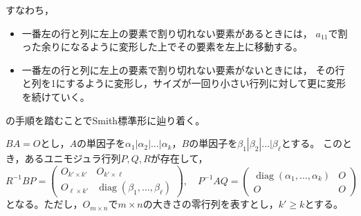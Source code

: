 \documentclass[uplatex]{jsarticle}
\DeclareMathOperator{\diag}{diag}
\begin{document}
すなわち，
\begin{itemize}
  \item 一番左の行と列に左上の要素で割り切れない要素があるときには，
  $a_{11}$で割った余りになるように変形した上でその要素を左上に移動する。
  \item 一番左の行と列に左上の要素で割り切れない要素がないときには，
  その行と列を1にするように変形し，サイズが一回り小さい行列に対して更に変形を続けていく。
\end{itemize}
の手順を踏むことでSmith標準形に辿り着く。

\begin{hodai}
  \label{hodai:homology3.unimod}
  $BA = O$とし，$A$の単因子を$\alpha_{1} | \alpha_{2} | \dots | \alpha_{k}$，$B$の単因子を$\beta_{1} | \beta_{2} | \dots | \beta_{\ell}$とする。
  このとき，あるユニモジュラ行列$P,Q,R$が存在して，
  \begin{equation}
    R^{-1} B P = \begin{pmatrix}
      O_{k' \times k'} & O_{k' \times \ell} \\ O_{\ell \times k'} & \diag (\beta_{1}, \dots, \beta_{\ell})
    \end{pmatrix}, \quad
    P^{-1} A Q = \begin{pmatrix}
      \diag (\alpha_{1}, \dots, \alpha_{k}) & O \\ O & O
    \end{pmatrix}
  \end{equation}
  となる。ただし，$O_{m \times n}$で$m \times n$の大きさの零行列を表すとし，$k' \ge k$とする。
\end{hodai}
\end{document}
